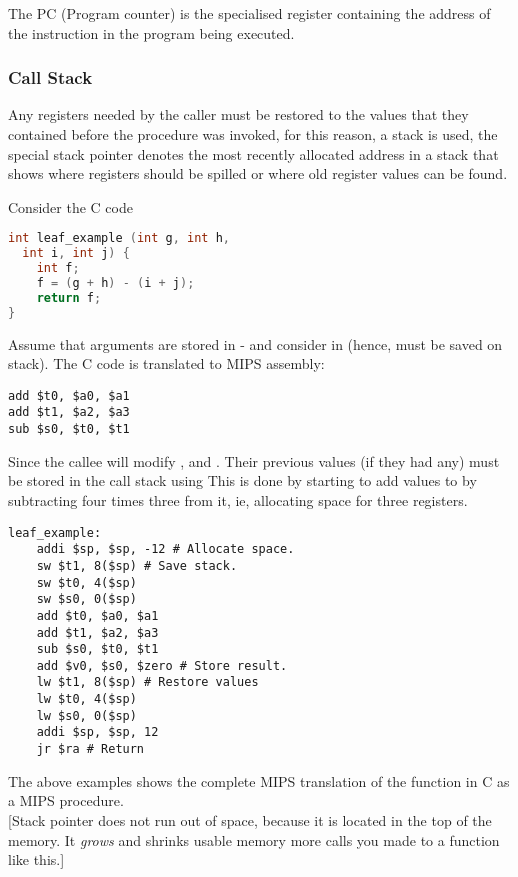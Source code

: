 \documentclass[11pt,a4paper,twocolumn]{book}
\begin{document}
The PC (Program counter) is the specialised register containing the address of the instruction in the program being executed.\\

\subsubsection{Call Stack}

Any registers needed by the caller must be restored to the values that they contained before the procedure was invoked, for this reason, a stack is used, the special stack pointer \Rsp denotes the most recently allocated address in a stack that shows where registers should be spilled or where old register values can be found.

Consider the C code

\begin{lstlisting}[language=C]
int leaf_example (int g, int h,
  int i, int j) {
	int f;
	f = (g + h) - (i + j);
	return f;
}
\end{lstlisting}

Assume that arguments are stored in  -  and consider  in  (hence,  must be saved on stack). The C code  is translated to MIPS assembly:

\begin{lstlisting}
add $t0, $a0, $a1
add $t1, $a2, $a3
sub $s0, $t0, $t1
\end{lstlisting}

Since the callee will modify ,  and . Their previous values (if they had any) must be stored in the call stack using \Rsp This is done by starting to add values to \Rsp by subtracting four times three from it, ie, allocating space for three registers.

\begin{lstlisting}
leaf_example:
	addi $sp, $sp, -12 # Allocate space.
	sw $t1, 8($sp) # Save stack.
	sw $t0, 4($sp)
	sw $s0, 0($sp)
	add $t0, $a0, $a1
	add $t1, $a2, $a3
	sub $s0, $t0, $t1
	add $v0, $s0, $zero # Store result.
	lw $t1, 8($sp) # Restore values
	lw $t0, 4($sp)
	lw $s0, 0($sp)
	addi $sp, $sp, 12
	jr $ra # Return
\end{lstlisting}

The above examples shows the complete MIPS translation of the  function in C as a MIPS procedure.\\

[Stack pointer does not run out of space, because it is located in the top of the memory. It \textit{grows} and shrinks usable memory more calls you made to a function like this.]
\end{document}
